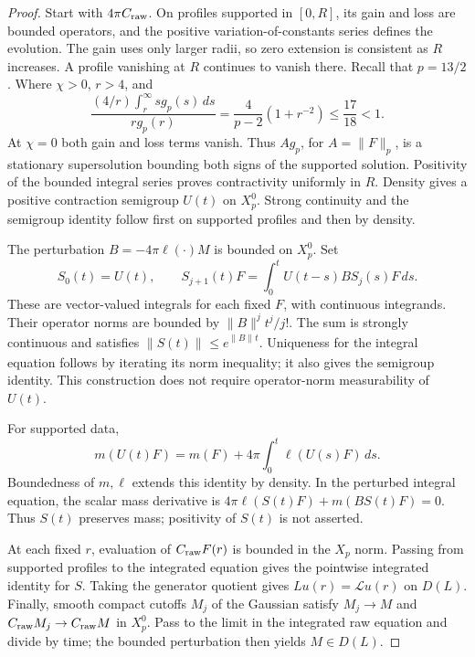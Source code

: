 \documentclass[11pt,a4paper]{article}
\numberwithin{equation}{section}
\theoremstyle{remark}
\newcommand{\calL}{\mathcal L}
\newcommand{\dd}{\,d}
\newcommand{\norm}[2]{\lVert #1\rVert_{#2}}
\begin{document}
\begin{proof}
Start with \(4\pi C_{\rm raw}\). On profiles supported in \([0,R]\),
its gain and loss are bounded operators, and the positive
variation-of-constants series defines the evolution. The gain uses only
larger radii, so zero extension is consistent as \(R\) increases. A
profile vanishing at \(R\) continues to vanish there.
Recall that \(p=13/2\). Where \(\chi>0\), \(r>4\), and
\begin{equation}\label{eq:row}
 \frac{(4/r)\int_r^\infty s g_p(s)\dd s}{r g_p(r)}
 =\frac4{p-2}(1+r^{-2})\leq\frac{17}{18}<1.
\end{equation}
At \(\chi=0\) both gain and loss terms vanish. Thus \(Ag_p\), for
\(A=\norm{F}{p}\), is a stationary supersolution bounding both signs of
the supported solution. Positivity of the bounded integral series
proves contractivity uniformly in \(R\). Density gives a positive
contraction semigroup \(U(t)\) on \(X_p^0\). Strong continuity and the
semigroup identity follow first on supported profiles and then by density.

The perturbation \(B=-4\pi\ell(\cdot)M\) is bounded on \(X_p^0\).
Set
\[
 S_0(t)=U(t),\qquad
 S_{j+1}(t)F=\int_0^t U(t-s)B S_j(s)F\dd s.
\]
These are vector-valued integrals for each fixed \(F\), with continuous
integrands. Their operator norms are bounded by
\(\norm{B}{}^jt^j/j!\). The sum is strongly continuous and satisfies
\(\norm{S(t)}{}\leq e^{\norm{B}{}t}\).
Uniqueness for the integral equation follows by iterating its norm
inequality; it also gives the semigroup identity. This construction
does not require operator-norm measurability of \(U(t)\).

For supported data,
\[
 m(U(t)F)=m(F)+4\pi\int_0^t\ell(U(s)F)\dd s.
\]
Boundedness of \(m,\ell\) extends this identity by density. In the
perturbed integral equation, the scalar mass derivative is
\(4\pi\ell(S(t)F)+m(BS(t)F)=0\). Thus \(S(t)\) preserves mass;
positivity of \(S(t)\) is not asserted.

At each fixed \(r\), evaluation of \(C_{\rm raw}F(r)\) is bounded in
the \(X_p\) norm. Passing from supported profiles to the integrated
equation gives the pointwise integrated identity for \(S\).
Taking the generator quotient gives \(Lu(r)=\calL u(r)\) on \(D(L)\).
Finally, smooth compact cutoffs \(M_j\) of the Gaussian satisfy
\(M_j\to M\) and \(C_{\rm raw}M_j\to C_{\rm raw}M\) in \(X_p^0\).
Pass to the limit in the integrated raw equation and divide by time;
the bounded perturbation then yields \(M\in D(L)\).
\end{proof}
\end{document}
